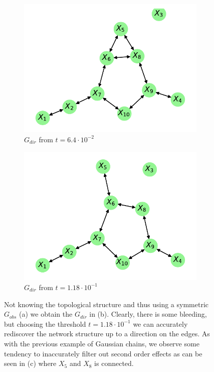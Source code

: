 \documentclass[../Thesis.tex]{subfiles}
\begin{document}
\begin{figure}[h]
\begin{subfigure}[t]{0.49\textwidth}
    \end{subfigure}
    \\[\baselineskip]
    \begin{subfigure}[t]{0.49\textwidth}
        \centering
        \includegraphics[width=.9\linewidth]{figures/Gaussian Network Theoretical/Graph from symmetric G obs - cor - cutoff 6_4e-2.pdf}
        \caption{$G_{dir}$  from $t = 6.4 \cdot 10^{-2}$}
    \end{subfigure}
    \hfill
    \begin{subfigure}[t]{0.49\textwidth}
        \centering
        \includegraphics[width=.9\linewidth]{figures/Gaussian Network Theoretical/Graph from symmetric G obs - cor - cutoff 1_18e-1.pdf}
        \caption{$G_{dir}$ from $t = 1.18 \cdot 10^{-1}$}
    \end{subfigure}
    \caption{Not knowing the topological structure and thus using a symmetric $G_{obs}$ (a) we obtain the $G_{dir}$ in (b). Clearly, there is some bleeding, but choosing the threshold $t = 1.18 \cdot 10^{-1}$ we can accurately rediscover the network structure up to a direction on the edges. As with the previous example of Gaussian chains, we observe some tendency to inaccurately filter out second order effects as can be seen in (c) where $X_5$ and $X_8$ is connected.}
    \label{fig:Gaussian network symmetric G_obs using correlation}
\end{figure}
\end{document}
